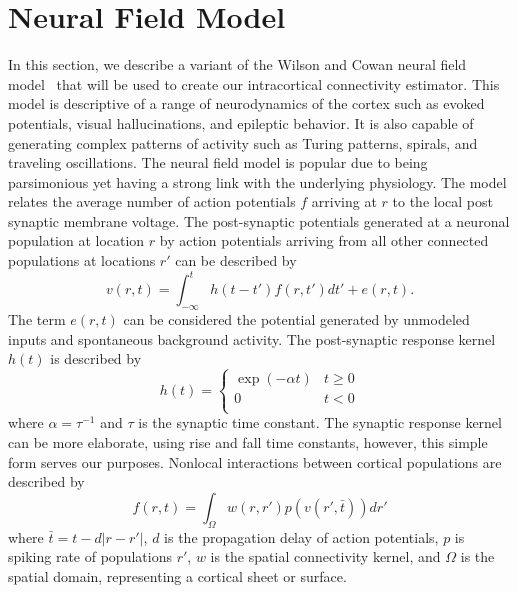 \documentclass[onecolumn,draftcls]{IEEEtran}
\begin{document}
\section{Neural Field Model}
In this section, we describe a variant of the  Wilson and Cowan neural field model~\cite{Wilson1973} that will be used to create our intracortical connectivity estimator. This model is descriptive of a range of neurodynamics of the cortex such as evoked potentials, visual hallucinations, and epileptic behavior. It is also capable of generating complex patterns of activity such as Turing patterns, spirals, and traveling oscillations. The neural field model is popular due to being parsimonious yet having a strong link with the underlying physiology.
The model relates the average number of action potentials $f$ arriving at $r$ to the local post synaptic membrane voltage. The post-synaptic potentials generated at a neuronal population at location $r$ by action potentials arriving from all other connected populations at locations $r'$ can be described by
\begin{equation}\label{SpikesToPotential}
v\left( {r,t} \right) = \int_{ - \infty }^t {h\left( {t - t'} \right)f\left( {r,t'} \right)dt'} + e\left( {r,t} \right).
\end{equation}
The term $e(r,t)$ can be considered the potential generated by unmodeled inputs and spontaneous background activity. The post-synaptic response kernel $h(t)$ is described by
\begin{equation}\label{SynapticRespKernel}
h(t) = \left\{ {\begin{array}{*{20}{c}}
   {\exp ( - \alpha t)} & {t \ge 0}  \\
   0 & {t < 0}  \\
\end{array}} \right.
\end{equation}
where $\alpha=\tau^{-1}$ and $\tau$ is the synaptic time constant. The synaptic response kernel can be more elaborate, using rise and fall time constants, however, this simple form serves our purposes. Nonlocal interactions between cortical populations are described by	
\begin{equation}\label{RateBasedInteractions}
f\left( {r,t} \right) = \int_\Omega  {w\left( {r,r'} \right)p\left( {v\left( {r',\bar t} \right)} \right)dr'}
\end{equation}
where $\bar t = t - d\left| {r - r'} \right|$, $d$ is the propagation delay of action potentials, $p$ is spiking rate of populations $r'$, $w$ is the spatial connectivity kernel, and $\Omega$ is the spatial domain, representing a cortical sheet or surface.
\end{document}
